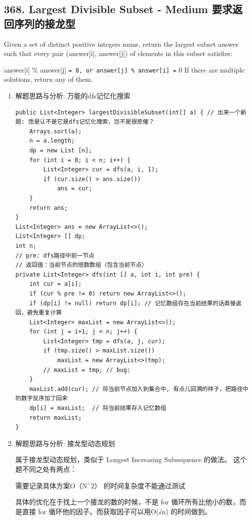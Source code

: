 \documentclass[9pt, b5paaper]{book}
\begin{document}
\subsection{368. Largest Divisible Subset - Medium 要求返回序列的接龙型}
\label{sec-1-4-18}
Given a set of distinct positive integers nums, return the largest subset answer such that every pair (answer[i], answer[j]) of elements in this subset satisfies:

answer[i] \% answer[j] \texttt{= 0, or
answer[j] \% answer[i] =} 0
If there are multiple solutions, return any of them.
\begin{enumerate}
\item 解题思路与分析: 万能的dfs记忆化搜索
\label{sec-1-4-18-1}
\begin{verbatim}
public List<Integer> largestDivisibleSubset(int[] a) { // 出来一个新题: 恁是认不是它是dfs记忆化搜索，岂不是很悲催？
    Arrays.sort(a);
    n = a.length;
    dp = new List [n];
    for (int i = 0; i < n; i++) {
        List<Integer> cur = dfs(a, i, 1);
        if (cur.size() > ans.size())
            ans = cur;
    }
    return ans;
}
List<Integer> ans = new ArrayList<>();
List<Integer> [] dp;
int n;
// pre: dfs路径中前一节点
// 返回值：当前节点的倍数数组（包含当前节点）
private List<Integer> dfs(int [] a, int i, int pre) { 
    int cur = a[i];
    if (cur % pre != 0) return new ArrayList<>(); 
    if (dp[i] != null) return dp[i]; // 记忆数组存在当前结果的话直接返回，避免重复计算
    List<Integer> maxList = new ArrayList<>();
    for (int j = i+1; j < n; j++) {
        List<Integer> tmp = dfs(a, j, cur);
        if (tmp.size() > maxList.size())
            maxList = new ArrayList<>(tmp);
        // maxList = tmp; // bug: 
    }
    maxList.add(cur); // 将当前节点加入到集合中, 有点儿回溯的样子，把路径中的数字反序加了回来
    dp[i] = maxList;  // 将当前结果存入记忆数组
    return maxList;
}
\end{verbatim}
\item 解题思路与分析: 接龙型动态规划
\label{sec-1-4-18-2}

属于接龙型动态规划，类似于 Longest Increasing Subsequence 的做法。 这个题不同之处有两点：

需要记录具体方案O（N\^{}2） 的时间复杂度不能通过测试

具体的优化在于找上一个接龙的数的时候，不是 for 循环所有比他小的数，而是直接 for 循环他的因子。而获取因子可以用O(√n) 的时间做到。


\end{enumerate}
\end{document}
